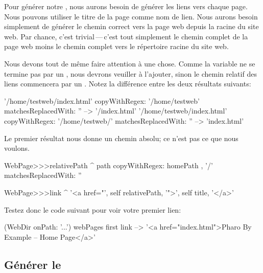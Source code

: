 \documentclass[a4paper,10pt,twoside]{book}
\begin{document}
Pour générer notre \sitemap, nous aurons besoin de générer les liens
vers chaque page.
Nous pouvons utiliser le titre de la page comme nom de lien. Nous
aurons besoin simplement de générer le chemin correct vers la page web
depuis la racine du site web.
Par chance, c'est trivial\,---\,c'est tout simplement le chemin
complet de la page web moins le chemin complet vers le répertoire
racine du site web.

Nous devons tout de même faire attention à une chose. Comme la
variable  ne se termine pas par un \ct{/}, nous devrons
veuiller à l'ajouter, sinon le chemin relatif des liens commencera par
un \ct{/}.
Notez la différence entre les deux résultats suivants:

\begin{code}{}
'/home/testweb/index.html' copyWithRegex: '/home/testweb' matchesReplacedWith: '' --> '/index.html'
'/home/testweb/index.html' copyWithRegex: '/home/testweb/' matchesReplacedWith: '' -->  'index.html'
\end{code}

Le premier résultat nous donne un chemin absolu; ce n'est pas ce que
nous voulons.


\begin{code}{}
WebPage>>>relativePath
	^ path 
		copyWithRegex: homePath , '/'
		matchesReplacedWith: ''

WebPage>>>link
	^ '<a href="', self relativePath, '">', self title, '</a>'
\end{code}

Testez donc le code suivant pour voir votre premier lien:

\begin{code}{}
(WebDir onPath: '...') webPages first link --> '<a href="index.html">Pharo By Example -- Home Page</a>'
\end{code}

\subsection{Générer le \sitemap}
\end{document}
